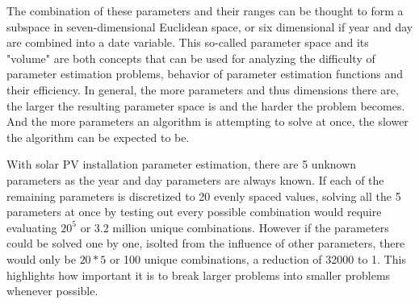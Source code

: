 
\vspace{3mm}
\noindent The combination of these parameters and their ranges can be thought to form a subspace in seven-dimensional Euclidean space, or six dimensional if year and day are combined into a date variable. This so-called parameter space and its "volume" are both concepts that can be used for analyzing the difficulty of parameter estimation problems, behavior of parameter estimation functions and their efficiency. In general, the more parameters and thus dimensions there are, the larger the resulting parameter space is and the harder the problem becomes. And the more parameters an algorithm is attempting to solve at once, the slower the algorithm can be expected to be.

With solar PV installation parameter estimation, there are 5 unknown parameters as the year and day parameters are always known. If each of the remaining parameters is discretized to 20 evenly spaced values, solving all the 5 parameters at once by testing out every possible combination would require evaluating $20^5$ or 3.2 million unique combinations. However if the parameters could be solved one by one, isolted from the influence of other parameters, there would only be $20*5$ or 100 unique combinations, a reduction of 32000 to 1. This highlights how important it is to break larger problems into smaller problems whenever possible.



